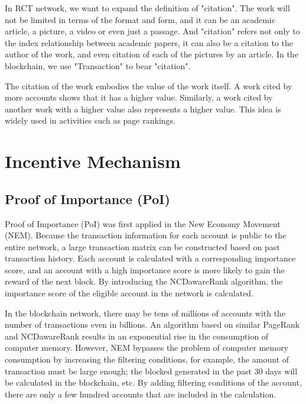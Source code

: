 \documentclass[a4paper,oneside,openany]{tufte-book}
\begin{document}
In RCT network, we want to expand the definition of "citation". The work will not be limited in terms of the format and form, and it can be an academic article, a picture, a video or even just a passage. And "citation" refers not only to the index relationship between academic papers, it can also be a citation to the author of the work, and even citation of each of the pictures by an article. In the blockchain, we use "Transaction" to bear "citation".


The citation of the work embodies the value of the work itself. A work cited by more accounts shows that it has a higher value. Similarly, a work cited by another work with a higher value also represents a higher value. This idea is widely used in activities such as page rankings.




\section{Incentive Mechanism}


\subsection{Proof of Importance (PoI)}

Proof of Importance (PoI) was first applied in the New Economy Movement (NEM). Because the transaction information for each account is public to the entire network, a large transaction matrix can be constructed based on past transaction history. Each account is calculated with a corresponding importance score, and an account with a high importance score is more likely to gain the reward of the next block. By introducing the NCDawareRank algorithm, the importance score of the eligible account in the network is calculated.





In the blockchain network, there may be tens of millions of accounts with the number of transactions even in billions. An algorithm based on similar PageRank and NCDawareRank results in an exponential rise in the consumption of computer memory. However, NEM bypasses the problem of computer memory consumption by increasing the filtering conditions, for example, the amount of transaction must be large enough; the blocked generated in the past 30 days will be calculated in the blockchain, etc. By adding filtering conditions of the account, there are only a few hundred accounts that are included in the calculation.
\end{document}

